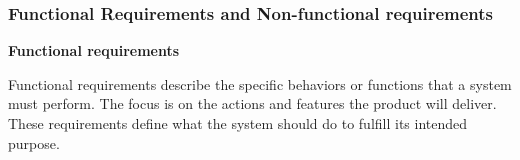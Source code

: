 \documentclass[a4paper]{article}
\begin{document}
%

\vspace{0.5 cm}
\subsubsection{\textbf{Functional Requirements and Non-functional requirements}}

\vspace{0.5 cm}
\begin{Large}\textbf{Functional requirements }\end{Large}

Functional requirements describe the specific behaviors or functions that a system must perform. 
The focus is on the actions and features the product will deliver. These requirements define what the system should do 
to fulfill its intended purpose.
\end{document}
